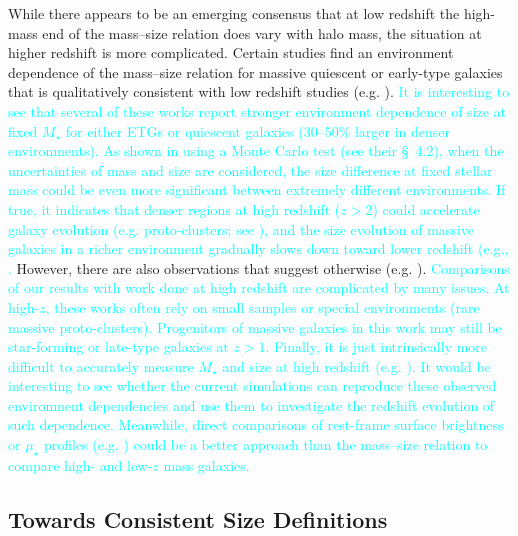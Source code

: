 \documentclass[a4paper,fleqn,usenatbib]{mnras}
\def\mstar{{$M_{\star}$}}
\def\mden{{$\mu_{\star}$}}
\newcommand{\song}[1]{\textcolor{cyan}{#1}}
\begin{document}
    While there appears to be an emerging consensus that at low redshift the 
    high-mass end of the mass--size relation does vary with halo mass, the situation 
    at higher redshift is more complicated. 
    Certain studies find an environment dependence of the mass--size relation for 
    massive quiescent or early-type galaxies that is qualitatively consistent with low 
    redshift studies (e.g. \citealt{Papovich2012, Bassett2013, Lani2013, 
    Strazzullo2013, Delaye2014}). 
    \song{
    It is interesting to see that several of these works report stronger 
    environment dependence of size at fixed \mstar{} for either ETGs or quiescent 
    galaxies (30--50\% larger in denser environments).
    As shown in \citet{HCompany13} using a Monte Carlo test (see their \S~4.2), 
    when the uncertainties of mass and size are considered, the size difference at 
    fixed stellar mass could be even more significant between extremely different
    environments.
    If true, it indicates that denser regions at high redshift ($z>2$) could accelerate 
    galaxy evolution (e.g. proto-clusters; see \citealt{Wang2016, Shimakawa2018}), and 
    the size evolution of massive galaxies in a richer environment gradually slows down
    toward lower redshift (e.g., \citealt{Papovich2012, Andreon2016}.
    }
    However, there are also observations that suggest otherwise (e.g. 
    \citealt{Rettura2010, Raichoor2012, Kelkar2015, Allen2015}). 
    \song{
    Comparisons of our results with work done at high redshift are complicated by many 
    issues. 
    At high-$z$, these works often rely on small samples or special environments 
    (rare massive proto-clusters). 
    Progenitors of massive galaxies in this work may still be star-forming or 
    late-type galaxies at $z>1$. 
    Finally, it is just intrinsically more difficult to accurately measure 
    \mstar{} and size at high redshift (e.g. \citealt{Price2017}).
    It would be interesting to see whether the current simulations can reproduce 
    these observed environment dependencies and use them to investigate the redshift
    evolution of such dependence. 
    Meanwhile, direct comparisons of rest-frame surface brightness or \mden{} 
    profiles (e.g. \citealt{Szomoru2012, Patel2013, Buitrago2017, Hill2017}) could be 
    a better approach than the 
    mass--size relation to compare high- and low-$z$ mass galaxies.
    }
    
\subsection{Towards Consistent Size Definitions}
        
\end{document}
